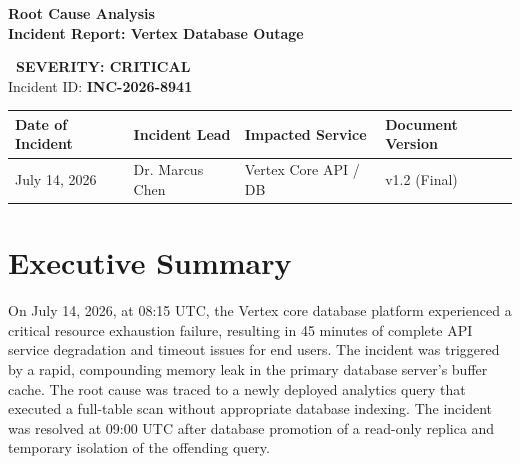 \documentclass[11pt,a4paper]{article}
\begin{document}
\noindent
\begin{minipage}[t]{0.62\textwidth}
  \vspace{0pt}
  {\Huge\bfseries\color{PrimaryColor} Root Cause Analysis} \\
  {\large\bfseries\color{SecondaryColor} Incident Report: Vertex Database Outage}
\end{minipage}%
\hfill
\begin{minipage}[t]{0.35\textwidth}
  \vspace{0pt}
  \raggedleft
  \begin{tcolorbox}[colback=WarningColor!10, colframe=WarningColor, arc=4pt, width=\textwidth, boxrule=1.5pt, halign=center, valign=center, top=6pt, bottom=6pt]
    \textcolor{WarningColor}{\textbf{\large\faExclamationTriangle~SEVERITY: CRITICAL}} \\
    \vspace{1pt}
    \textcolor{PrimaryColor}{\small Incident ID: \textbf{INC-2026-8941}}
  \end{tcolorbox}
\end{minipage}

\vspace{0.3cm}

\noindent
\begin{tabularx}{\textwidth}{@{} X X X X @{}}
  \toprule
  \textbf{\small Date of Incident} & \textbf{\small Incident Lead} & \textbf{\small Impacted Service} & \textbf{\small Document Version} \\
  \midrule
  July 14, 2026 & Dr. Marcus Chen & Vertex Core API / DB & v1.2 (Final) \\
  \bottomrule
\end{tabularx}

\vspace{0.4cm}

\section{Executive Summary}
On July 14, 2026, at 08:15 UTC, the Vertex core database platform experienced a critical resource exhaustion failure, resulting in 45 minutes of complete API service degradation and timeout issues for end users. The incident was triggered by a rapid, compounding memory leak in the primary database server's buffer cache. The root cause was traced to a newly deployed analytics query that executed a full-table scan without appropriate database indexing. The incident was resolved at 09:00 UTC after database promotion of a read-only replica and temporary isolation of the offending query.
\end{document}
